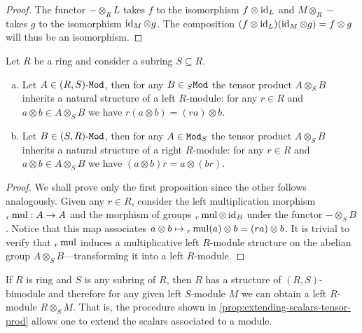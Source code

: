 \begin{proof}
    The functor \(- \otimes_R L\) takes \(f\) to the isomorphism \(f \otimes \operatorname{id}_L\)
    and \(M \otimes_R -\) takes \(g\) to the isomorphism \(\operatorname{id}_M \otimes g\). The
    composition \((f \otimes \operatorname{id}_L) (\operatorname{id}_M \otimes g) = f \otimes g\) will thus be
    an isomorphism.
\end{proof}

\begin{proposition}
    \label{prop:extending-scalars-tensor-prod}
    Let \(R\) be a ring and consider a subring \(S \subseteq R\).
    \begin{enumerate}[(a)]\setlength\itemsep{0em}
        \item Let \(A \in {(R, S)\text{-}\texttt{Mod}}\), then for any \(B \in {{}_{S}\texttt{Mod}}\) the tensor
              product \(A \otimes_S B\) inherits a natural structure of a left \(R\)-module:
              for any \(r \in R\) and \(a \otimes b \in A \otimes_S B\) we have
              \(r(a \otimes b) = (r a) \otimes b\).

        \item Let \(B \in {(S, R)\text{-}\texttt{Mod}}\), then for any \(A \in {\texttt{Mod}_{S}}\) the tensor
              product \(A \otimes_S B\) inherits a natural structure of a right \(R\)-module:
              for any \(r \in R\) and \(a \otimes b \in A \otimes_S B\) we have
              \((a \otimes b) r = a \otimes (b r)\).
    \end{enumerate}
\end{proposition}

\begin{proof}
    We shall prove only the first proposition since the other follows
    analogously. Given any \(r \in R\), consider the left multiplication morphism
    \({}_r\operatorname{mul}: A \to A\) and the morphism of groups \({}_r\operatorname{mul} \otimes \operatorname{id}_B\)
    under the functor \(- \otimes_S B\). Notice that this map associates
    \(a \otimes b \mapsto {}_r\operatorname{mul}(a) \otimes b = (r a) \otimes b\). It is trivial
    to verify that \({}_r\operatorname{mul}\) induces a multiplicative left \(R\)-module
    structure on the abelian group \(A \otimes_S B\)---transforming it into a left
    \(R\)-module.
\end{proof}

\begin{example}
    \label{exp:extending-scalars-tensor-product}
    If \(R\) is ring and \(S\) is any subring of \(R\), then \(R\) has a structure
    of \((R, S)\)-bimodule and therefore for any given left \(S\)-module \(M\) we
    can obtain a left \(R\)-module \(R \otimes_S M\). That is, the procedure shown
    in \cref{prop:extending-scalars-tensor-prod} allows one to extend the scalars
    associated to a module.
\end{example}




